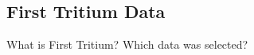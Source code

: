 \documentclass{document/thesisclass}
\begin{document}
    \Appendix
    \chapter*{\appendixname} 
    
    
    
    \section{First Tritium Data}
    What is First Tritium? Which data was selected?
    
    \glsaddall
    \printglossary[type=\acronymtype]
    \TheBibliography
    \printbibliography
\end{document}

